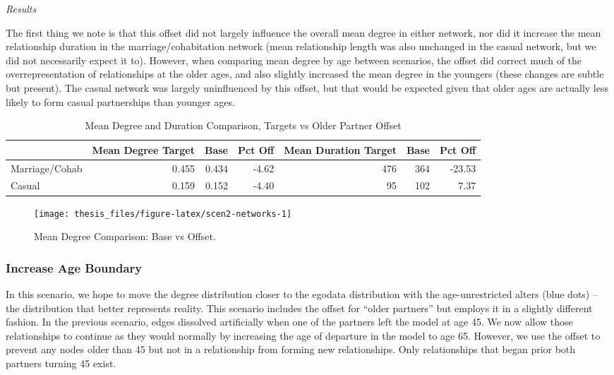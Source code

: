 \documentclass [11pt, proquest] {uwthesis}[2015/03/03]
\begin{document}
\emph{Results}

The first thing we note is that this offset did not largely influence
the overall mean degree in either network, nor did it increase the mean
relationship duration in the marriage/cohabitation network (mean
relationship length was also unchanged in the casual network, but we did
not necessarily expect it to). However, when comparing mean degree by
age between scenarios, the offset did correct much of the
overrepresentation of relationships at the older ages, and also slightly
increased the mean degree in the youngers (these changes are subtle but
present). The casual network was largely uninfluenced by this offset,
but that would be expected given that older ages are actually less
likely to form casual partnerships than younger ages.
\begin{table}

\caption{\label{tab:scen2-tab}Mean Degree and Duration Comparison, Targets vs Older Partner Offset}
\centering
\begin{tabular}[t]{lrrrrrr}
\toprule
  & Mean Degree Target & Base & Pct Off & Mean Duration Target & Base & Pct Off\\
\midrule
Marriage/Cohab & 0.455 & 0.434 & -4.62 & 476 & 364 & -23.53\\
Casual & 0.159 & 0.152 & -4.40 & 95 & 102 & 7.37\\
\bottomrule
\end{tabular}
\end{table}
\begin{figure}

{\centering \texttt{[image: thesis\_files/figure-latex/scen2-networks-1]} 

}

\caption{Mean Degree Comparison: Base vs Offset.}\label{fig:scen2-networks}
\end{figure}
\subsubsection{Increase Age Boundary}\label{increase-age-boundary}

In this scenario, we hope to move the degree distribution closer to the
egodata distribution with the age-unrestricted alters (blue dots) -- the
distribution that better represents reality. This scenario includes the
offset for ``older partners'' but employs it in a slightly different
fashion. In the previous scenario, edges dissolved artificially when one
of the partners left the model at age 45. We now allow those
relationships to continue as they would normally by increasing the age
of departure in the model to age 65. However, we use the offset to
prevent any nodes older than 45 but not in a relationship from forming
new relationships. Only relationships that began prior both partners
turning 45 exist.
\end{document}
